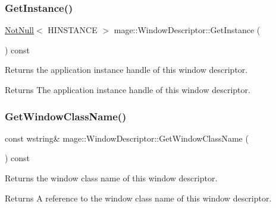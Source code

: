 \subsubsection{\texorpdfstring{Get\+Instance()}{GetInstance()}}
{\footnotesize\ttfamily \mbox{\hyperlink{namespacemage_a8769f9d670d6b585ea306cb1062af94b}{Not\+Null}}$<$ H\+I\+N\+S\+T\+A\+N\+CE $>$ mage\+::\+Window\+Descriptor\+::\+Get\+Instance (\begin{DoxyParamCaption}{ }\end{DoxyParamCaption}) const\hspace{0.3cm}{\ttfamily [noexcept]}}

Returns the application instance handle of this window descriptor.

\begin{DoxyReturn}{Returns}
The application instance handle of this window descriptor. 
\end{DoxyReturn}
\mbox{\label{classmage_1_1_window_descriptor_a28e28c6aca97423689066d0f642e3561}} 
\subsubsection{\texorpdfstring{Get\+Window\+Class\+Name()}{GetWindowClassName()}}
{\footnotesize\ttfamily const wstring\& mage\+::\+Window\+Descriptor\+::\+Get\+Window\+Class\+Name (\begin{DoxyParamCaption}{ }\end{DoxyParamCaption}) const\hspace{0.3cm}{\ttfamily [noexcept]}}

Returns the window class name of this window descriptor.

\begin{DoxyReturn}{Returns}
A reference to the window class name of this window descriptor. 
\end{DoxyReturn}
\mbox{\label{classmage_1_1_window_descriptor_a539433423c905e8b45d5bc9d895ee79c}} 
